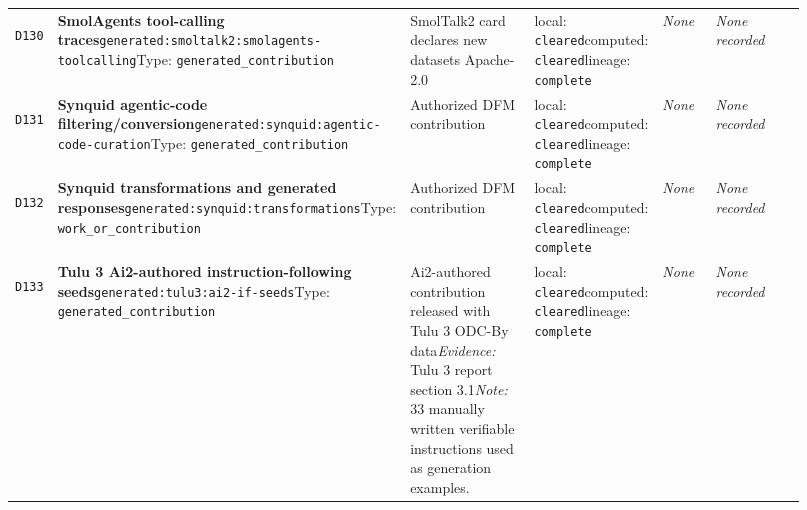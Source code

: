 \documentclass[9pt,a4paper]{article}
\newcommand{\depid}[1]{\hypertarget{dep:#1}{\texttt{#1}}}
\begin{document}
\begin{landscape}
\begin{longtable}{@{}L{0.035\linewidth}L{0.185\linewidth}L{0.27\linewidth}L{0.09\linewidth}L{0.10\linewidth}L{0.24\linewidth}@{}}
\depid{D130} & \textbf{SmolAgents tool-calling traces}\newline \nolinkurl{generated:smoltalk2:smolagents-toolcalling}\newline Type: \texttt{generated\_contribution} & SmolTalk2 card declares new datasets Apache-2.0 & local: \texttt{cleared}\newline computed: \texttt{cleared}\newline lineage: \texttt{complete} & \textit{None} & \textit{None recorded} \\
\depid{D131} & \textbf{Synquid agentic-code filtering/conversion}\newline \nolinkurl{generated:synquid:agentic-code-curation}\newline Type: \texttt{generated\_contribution} & Authorized DFM contribution & local: \texttt{cleared}\newline computed: \texttt{cleared}\newline lineage: \texttt{complete} & \textit{None} & \textit{None recorded} \\
\depid{D132} & \textbf{Synquid transformations and generated responses}\newline \nolinkurl{generated:synquid:transformations}\newline Type: \texttt{work\_or\_contribution} & Authorized DFM contribution & local: \texttt{cleared}\newline computed: \texttt{cleared}\newline lineage: \texttt{complete} & \textit{None} & \textit{None recorded} \\
\depid{D133} & \textbf{Tulu 3 Ai2-authored instruction-following seeds}\newline \nolinkurl{generated:tulu3:ai2-if-seeds}\newline Type: \texttt{generated\_contribution} & Ai2-authored contribution released with Tulu 3 ODC-By data\newline \textit{Evidence:} Tulu 3 report section 3.1\newline \textit{Note:} 33 manually written verifiable instructions used as generation examples. & local: \texttt{cleared}\newline computed: \texttt{cleared}\newline lineage: \texttt{complete} & \textit{None} & \textit{None recorded} \\

\end{longtable}
\end{landscape}
\end{document}
